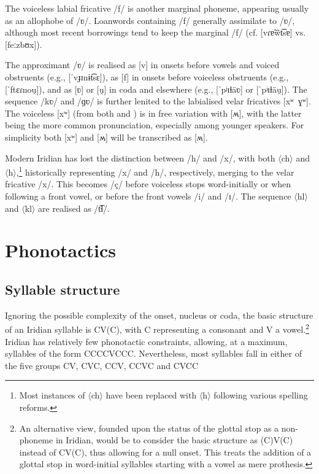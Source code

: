 The voiceless labial fricative /f/ is another marginal phoneme, appearing usually as an allophobe of /ʋ/. Loanwords containing /f/ generally assimilate to /ʋ/, although most recent borrowings tend to keep the marginal /f/ (cf.  [vɾɐ̃w̃t͡sɐ] vs.  [feːzbʊx]).

The approximant /ʋ/ is realised as [v] in onsets before vowels and voiced obstruents (e.g.,  [ˈvɟɪnɨt͡sɛ]), as [f] in onsets before voiceless obstruents (e.g.,  [ˈftɛɾnou̯]), and as [ʋ] or [u̯] in coda and elsewhere (e.g.,  [ˈpʲɪɫäʋ] or [ˈpʲɪɫäu̯]). The sequence /kʋ/ and /ɡʋ/ is further lenited to the labialised velar fricatives [xʷ~ɣʷ]. The voiceless [xʷ] (from both  and ) is in free variation with [ʍ], with the latter being the more common pronunciation, especially among younger speakers. For simplicity both [xʷ] and [ʍ] will be transcribed as [ʍ].

Modern Iridian has lost the distinction between /h/ and /x/, with both $\langle$ch$\rangle$ and $\langle$h$\rangle$,\footnote{Most instances of $\langle$ch$\rangle$ have been replaced with $\langle$h$\rangle$ following various spelling reforms.} historically representing /x/ and /h/, respectively, merging to the velar fricative /x/. This becomes /ç/ before voiceless stops word-initially or when following a front vowel, or before the front vowels /i/ and /ɪ/. The sequence $\langle$hl$\rangle$ and $\langle$kl$\rangle$ are realised as /t͡ɬ/.


\section{Phonotactics}\label{sec:phonotactics}

\subsection{Syllable structure}\label{sec:syllable-structure}

Ignoring the possible complexity of the onset, nucleus or coda, the basic structure of an Iridian syllable is CV(C), with C representing a consonant and V a vowel.\footnote{An alternative view, founded upon the status of the glottal stop as a non-phoneme in Iridian, would be to consider the basic structure as (C)V(C) instead of CV(C), thus allowing for a null onset. This treats the addition of a glottal stop in word-initial syllables starting with a vowel as mere prothesis.} Iridian has relatively few phonotactic constraints, allowing, at a maximum, syllables of the form CCCCVCCC. Nevertheless, most syllables fall in either of the five groups CV, CVC, CCV, CCVC and CVCC

